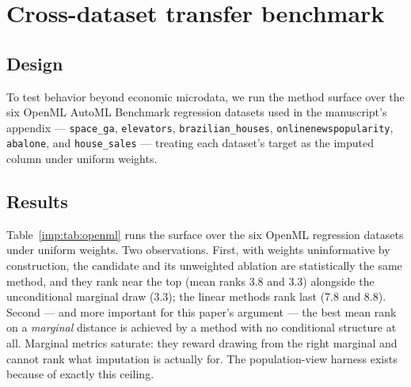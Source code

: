 \section{Cross-dataset transfer benchmark}
\label{imp:app:openml}
\label{imp:sec:task-openml}
\label{imp:sec:results-openml}

\subsection{Design}


To test behavior beyond economic microdata, we run the method surface over
the six OpenML AutoML Benchmark regression datasets used in the
\microimpute{} manuscript's appendix \citep{vanschoren2014openml} ---
\texttt{space\_ga}, \texttt{elevators}, \texttt{brazilian\_houses},
\texttt{onlinenewspopularity}, \texttt{abalone}, and \texttt{house\_sales}
--- treating each dataset's target as the imputed column under uniform
weights.


\subsection{Results}


\begin{table}[t]
\centering
\footnotesize
\resizebox{\textwidth}{!}{}
\caption{Wasserstein-1 to the donor distribution across the six OpenML
regression datasets (uniform weights), mean over ten paired seeds, with mean
rank across datasets.}
\label{imp:tab:openml}
\end{table}

Table~\ref{imp:tab:openml} runs the surface over the six OpenML regression
datasets under uniform weights. Two observations. First, with weights
uninformative by construction, the candidate and its unweighted ablation are
statistically the same method, and they rank near the top (mean ranks 3.8 and
3.3) alongside the unconditional marginal draw (3.3); the linear methods rank
last (7.8 and 8.8). Second --- and more important for this paper's argument --- the best
mean rank on a \emph{marginal} distance is achieved by a method with no
conditional structure at all. Marginal metrics saturate: they reward drawing
from the right marginal and cannot rank what imputation is actually for.
The population-view harness exists because of exactly this ceiling.

